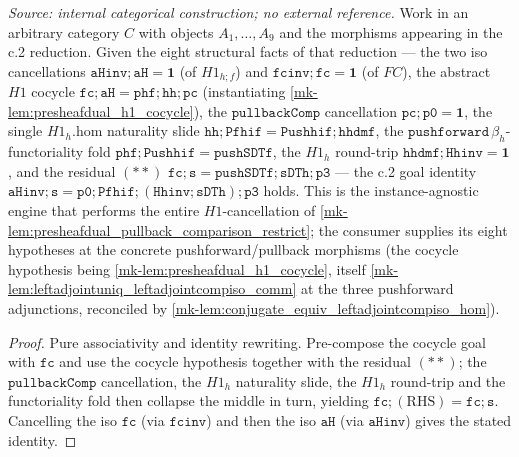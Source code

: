 \begin{lemma}\label{mk-lem:c2_assemble}
  \leanok

  \textit{Source: internal categorical construction; no external reference.}
  Work in an arbitrary category \(C\) with objects \(A_1, \dots, A_9\) and the morphisms appearing in
  the c.2 reduction. Given the eight structural facts of that reduction --- the two iso cancellations
  \(\mathtt{aHinv} \mathbin{;} \mathtt{aH} = \mathbf{1}\) (of \(H1_{h \mathbin{;} f}\)) and
  \(\mathtt{fcinv} \mathbin{;} \mathtt{fc} = \mathbf{1}\) (of \(FC\)), the abstract \(H1\) cocycle
  \(\mathtt{fc} \mathbin{;} \mathtt{aH} = \mathtt{phf} \mathbin{;} \mathtt{hh} \mathbin{;} \mathtt{pc}\)
  (instantiating \ref{mk-lem:presheafdual_h1_cocycle}), the \(\mathtt{pullbackComp}\) cancellation
  \(\mathtt{pc} \mathbin{;} \mathtt{p0} = \mathbf{1}\), the single \(H1_h.\mathrm{hom}\) naturality
  slide \(\mathtt{hh} \mathbin{;} \mathtt{Pfhif} = \mathtt{Pushhif} \mathbin{;} \mathtt{hhdmf}\), the
  \(\mathtt{pushforward}\,\beta_h\)-functoriality fold
  \(\mathtt{phf} \mathbin{;} \mathtt{Pushhif} = \mathtt{pushSDTf}\), the \(H1_h\) round-trip
  \(\mathtt{hhdmf} \mathbin{;} \mathtt{Hhinv} = \mathbf{1}\), and the residual \((**)\)
  \(\mathtt{fc} \mathbin{;} \mathtt{s} = \mathtt{pushSDTf} \mathbin{;} \mathtt{sDTh} \mathbin{;} \mathtt{p3}\)
  --- the c.2 goal identity
  \(\mathtt{aHinv} \mathbin{;} \mathtt{s}
    = \mathtt{p0} \mathbin{;} \mathtt{Pfhif} \mathbin{;} (\mathtt{Hhinv} \mathbin{;} \mathtt{sDTh}) \mathbin{;} \mathtt{p3}\)
  holds. This is the instance-agnostic engine that performs the entire \(H1\)-cancellation of
  \ref{mk-lem:presheafdual_pullback_comparison_restrict}; the consumer supplies its eight hypotheses at
  the concrete pushforward/pullback morphisms (the cocycle hypothesis being
  \ref{mk-lem:presheafdual_h1_cocycle}, itself \ref{mk-lem:leftadjointuniq_leftadjointcompiso_comm} at the
  three pushforward adjunctions, reconciled by \ref{mk-lem:conjugate_equiv_leftadjointcompiso_hom}).
\end{lemma}
\begin{proof}
  \leanok
  Pure associativity and identity rewriting. Pre-compose the cocycle goal with \(\mathtt{fc}\) and use
  the cocycle hypothesis together with the residual \((**)\); the \(\mathtt{pullbackComp}\)
  cancellation, the \(H1_h\) naturality slide, the \(H1_h\) round-trip and the functoriality fold then
  collapse the middle in turn, yielding \(\mathtt{fc} \mathbin{;} (\text{RHS}) = \mathtt{fc} \mathbin{;} \mathtt{s}\).
  Cancelling the iso \(\mathtt{fc}\) (via \(\mathtt{fcinv}\)) and then the iso \(\mathtt{aH}\) (via
  \(\mathtt{aHinv}\)) gives the stated identity.
\end{proof}

